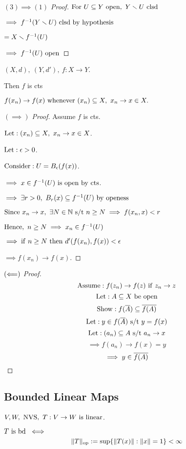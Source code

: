 \documentclass[12pt]{article}
\begin{document}
\bboxproof
\begin{proof}[\((3)\implies(1)\) Proof]
    \(\TR{For}\ U\ssq Y\ \TR{open},\ Y\smin U\ \TR{clsd}\)

    \(\implies f^{-1}(Y\smin U)\ \TR{clsd\ by\ hypothesis}\)

    \(=X\smallsetminus f^{-1}(U)\)
    
    \(\implies f^{-1}(U)\ \TR{open}\)
\end{proof}
\ebox


\bboxprop
\begin{prop}
    \((X,d),\ (Y,d'),\ f:X\to Y\).

    Then \(f\) is cts 

    \(f(x_n)\to f(x)\ \mathrm{whenever}\ (x_n)\subseteq X,\ x_n\to x\in X.\)
\end{prop}
\ebox

\bboxproof
\begin{proof}[\((\implies)\) Proof]
    Assume \(f\) is cts.

    \(\mathrm{Let}:(x_n)\subseteq X,\ x_n\to x\in X\).

    \(\mathrm{Let}:\epsilon>0\).

    \(\mathrm{Consider}:U=B_\epsilon(f(x))\).

    \(\implies x\in f^{-1}(U)\ \is\ \TR{open\ by\ cts}\).

    \(\implies\exists r>0,\ B_r(x)\subseteq f^{-1}(U)\ \mathrm{by\ openess}\)

    \(\mathrm{Since}\ x_n\to x,\ \exists N\in\mathbb N\text{ s/t } n\ge N\implies f(x_n,x)<r\)

    \(\mathrm{Hence},\ n\ge N\implies x_n\in f^{-1}(U)\)

    \(\implies\mathrm{if}\ n\ge N\ \mathrm{then}\ d'(f(x_n), f(x))<\epsilon\)

    \(\implies f(x_n)\to f(x)\).
\end{proof}
\ebox


\bboxproof
\begin{proof}[\((\Longleftarrow)\) Proof]
    \[
        \mathrm{Assume}: f(z_n)\to f(z)\ \mathrm{if}\ z_n\to z
    \]
    \[
        \llet:A\ssq X\ \TR{be\ open}
    \]
    \[
        \mathrm{Show}: f(\overline{A})\subseteq\overline{f(A)}
    \]
    \[
        \mathrm{Let}: y\in f(\overline{A})\text{ s/t } y=f(x)
    \]
    \[
        \mathrm{Let}: (a_n)\subseteq A\text{ s/t } a_n\to x
    \]
    \[
        \implies f(a_n)\to f(x)=y
    \]
    \[
        \implies y\in \overline{f(A)}
    \]
\end{proof}
\ebox

\subsection{Bounded Linear Maps}
\bboxdefn
\begin{defn}
    \(V,W,\ \TR{NVS},\ T:V\to W\ \is\ \TR{linear}\).

    \(T\ \mathrm{is}\ \mathrm{bd}\ \iff\)
    \[
        \|T\|_{\mathrm{op}}:=\sup\{
            \|T(x)\|:\|x\|=1
        \} < \infty
    \]
\end{defn}
\ebox
\end{document}
